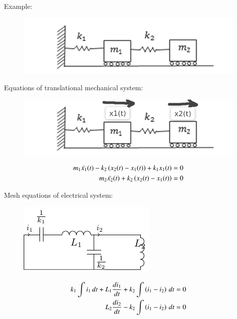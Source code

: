 \documentclass[journal,12pt,onecolumn]{IEEEtran}
\theoremstyle{remark}
\begin{document}
Example: 
\begin{figure}[!ht]
    \centering
    \includegraphics[scale=0.5]{figs/g54.fig1.png}
    \caption{ }
    \label{fig:ishitha.g22.nm.54.f1}
\end{figure}  


Equations of translational mechanical system:\\

\begin{figure}[!ht]
    \centering
    \includegraphics[scale=0.5]{figs/g54.fig2.jpeg}
    \caption{ }
    \label{fig:ishitha.g22.nm.54.f2}
\end{figure} 


\begin{align}
m_1\ddot{x_1}(t) - k_2\left(x_2(t)-x_1(t)\right)+ k_1x_1(t)&=0
\label{eq:ishitha.g22.nm.54.1.eq}\\
m_2\ddot{x_2}(t) + k_2\left(x_2(t)-x_1(t)\right)&=0
\label{eq:ishitha.g22.nm.54.2.eq} 
\end{align}

Mesh equations of electrical system:\\   

\begin{figure}[!ht]
    \centering
    \includegraphics[scale=1.5]{figs/tikz.pdf}
    \caption{ }
    \label{fig:ishitha.g22.nm.54.f3}
\end{figure}   
\begin{align}
 k_1\int i_1 \, dt + L_1\frac{di_1}{dt}+k_2\int \left(i_1-i_2\right) \, dt &=0\\
 L_2\frac{di_2}{dt}-k_2\int \left(i_1-i_2\right) \, dt &=0
\end{align}    
\end{document}
